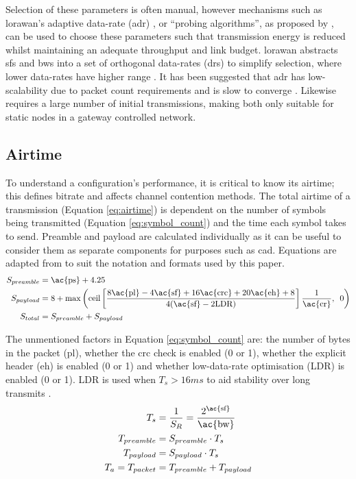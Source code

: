 Selection of these parameters is often manual, however mechanisms such as \ac{lorawan}'s adaptive data-rate (\ac{adr}) \cite{3YP:LORAWAN}, or ``probing algorithms'', as proposed by \cite{3YP:CHOOSING_LORA_PARAMETERS}, can be used to choose these parameters such that transmission energy is reduced whilst maintaining an adequate throughput and link budget. \ac{lorawan} abstracts \ac{sf}s and \ac{bw}s into a set of orthogonal data-rates (\ac{dr}s) to simplify selection, where lower data-rates have higher range \cite{3YP:LORAWAN_REGIONAL_PARAMS}. It has been suggested that \ac{adr} has low-scalability due to packet count requirements \cite{3YP:LORAWAN_ADR} and is slow to converge \cite{3YP:LORAWAN_ADR_AGILITY}. Likewise \cite{3YP:CHOOSING_LORA_PARAMETERS} requires a large number of initial transmissions, making both only suitable for static nodes in a gateway controlled network.

\subsection{Airtime}\label{sec:airtime}
To understand a configuration's performance, it is critical to know its airtime; this defines bitrate and affects channel contention methods. The total airtime of a transmission (Equation \ref{eq:airtime}) is dependent on the number of symbols being transmitted (Equation \ref{eq:symbol_count}) and the time each symbol takes to send. Preamble and payload are calculated individually as it can be useful to consider them as separate components for purposes such as \ac{cad}. Equations are adapted from \cite{3YP:LORA_SX12} to suit the notation and formats used by this paper.
\begin{subequations}
\label{eq:symbol_count}
\begin{align}
	S_{preamble} &= \text{\ac{ps}} + 4.25 \\
	S_{payload} &= 8 + \max\left( \text{ceil}\left[ \frac{8\text{\ac{pl}}-4\text{\ac{sf}}+16\text{\ac{crc}}+20\text{\ac{eh}}+8}{4(\text{\ac{sf}}-2\text{LDR})}\right] \frac{1}{\text{\ac{cr}}},\enskip 0\right) \\
	S_{total} &= S_{preamble} + S_{payload} 
\end{align}
\end{subequations}

The unmentioned factors in Equation \ref{eq:symbol_count} are: the number of bytes in the packet (\ac{pl}), whether the \ac{crc} check is enabled (0 or 1), whether the explicit header (\ac{eh}) is enabled (0 or 1) and whether low-data-rate optimisation (LDR) is enabled (0 or 1). LDR is used when $T_s > 16ms$ to aid stability over long transmits \cite{3YP:LORA_SX12}.
\begin{subequations}
\label{eq:airtime}
\begin{align}
	T_{s} &= \frac{1}{S_R} = \frac{2^{\text{\ac{sf}}}}{\text{\ac{bw}}}\label{eq:symbol_time} \\
	T_{preamble} &=  S_{preamble}\cdot T_{s}\\
	T_{payload} &= S_{payload}\cdot T_{s} \\
	T_{a} = T_{packet} &= T_{preamble} + T_{payload}
\end{align}
\end{subequations}

